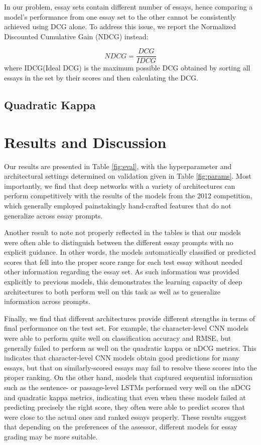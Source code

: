 \documentclass[10pt,psamsfonts]{amsart}
\theoremstyle{definition}
\theoremstyle{remark}
\numberwithin{equation}{section}
\begin{document}
In our problem, essay sets contain different number of essays, hence comparing a model's performance from one essay set to the other cannot be consistently achieved using DCG alone. To address this issue, we report the Normalized Discounted Cumulative Gain (NDCG) instead:

$$NDCG=\frac{DCG}{IDCG}$$
where IDCG(Ideal DCG) is the maximum possible DCG obtained by sorting all essays in the set by their scores and then calculating the DCG.

\subsection*{Quadratic Kappa}



\section*{Results and Discussion}

Our results are presented in Table \ref{fig:eval}, with the hyperparameter and architectural settings determined on validation given in Table \ref{fig:params}. Most importantly, we find that deep networks with a variety of architectures can perform competitively with the results of the models from the 2012 competition, which generally employed painstakingly hand-crafted features that do not generalize across essay prompts.

Another result to note not properly reflected in the tables is that our models were often able to distinguish between the different essay prompts with no explicit guidance. In other words, the models automatically classified or predicted scores that fell into the proper score range for each test essay without needed other information regarding the essay set. As such information was provided explicitly to previous models, this demonstrates the learning capacity of deep architectures to both perform well on this task as well as to generalize information across prompts.

Finally, we find that different architectures provide different strengths in terms of final performance on the test set. For example, the character-level CNN models were able to perform quite well on classification accuracy and RMSE, but generally failed to perform as well on the quadratic kappa or nDCG metrics. This indicates that character-level CNN models obtain good predictions for many essays, but that on similarly-scored essays may fail to resolve these scores into the proper ranking. On the other hand, models that captured sequential information such as the sentence- or passage-level LSTMs performed very well on the nDCG and quadratic kappa metrics, indicating that even when these models failed at predicting precisely the right score, they often were able to predict scores that were close to the actual ones and ranked essays properly. These results suggest that depending on the preferences of the assessor, different models for essay grading may be more suitable.
\end{document}

